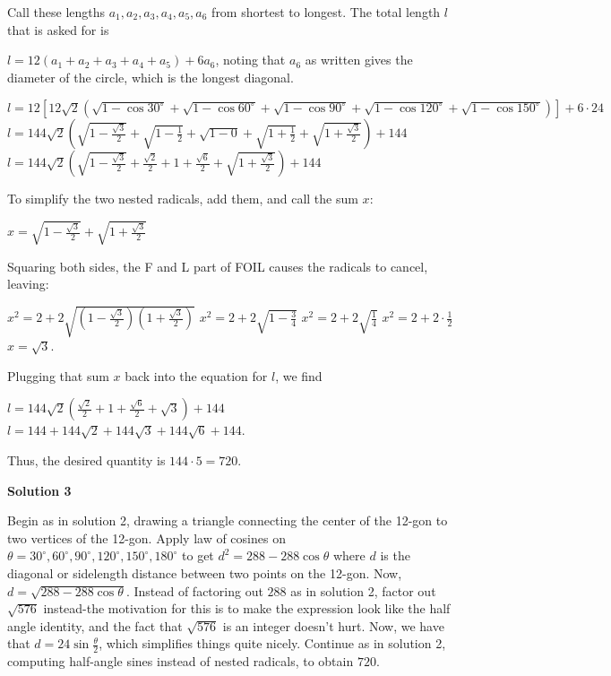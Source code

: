 \begin{enumerate}
 Call these lengths $a_1, a_2, a_3, a_4, a_5, a_6$ from shortest to longest.  The total length $l$ that is asked for is

 $l = 12(a_1 + a_2 + a_3 + a_4 + a_5) + 6a_6$, noting that $a_6$ as written gives the diameter of the circle, which is the longest diagonal.

 


 $l = 12[12\sqrt{2} (\sqrt{1 - \cos 30^{\circ}}+\sqrt{1-\cos 60^{\circ}}+\sqrt{1-\cos 90^{\circ}}+\sqrt{1-\cos 120^{\circ}}+\sqrt{1 - \cos 150^{\circ}})] + 6 \cdot 24$
$l = 144\sqrt{2} \left(\sqrt{1 - \frac{\sqrt{3}}{2}} + \sqrt{1 - \frac{1}{2}} + \sqrt{1-0} + \sqrt{1 + \frac{1}{2}} + \sqrt{1 + \frac{\sqrt{3}}{2}}\right) + 144$
$l = 144\sqrt{2} \left(\sqrt{1 - \frac{\sqrt{3}}{2}} + \frac{\sqrt{2}}{2} + 1 + \frac{\sqrt{6}}{2} + \sqrt{1 + \frac{\sqrt{3}}{2}}\right) + 144$

 
To simplify the two nested radicals, add them, and call the sum $x$:

 $x = \sqrt{1 - \frac{\sqrt{3}}{2}} + \sqrt{1 + \frac{\sqrt{3}}{2}}$

 Squaring both sides, the F and L part of FOIL causes the radicals to cancel, leaving:

 $x^2 = 2 + 2\sqrt{\left(1 - \frac{\sqrt{3}}{2}\right)\left(1 + \frac{\sqrt{3}}{2}\right)}$
$x^2 = 2 + 2\sqrt{1 - \frac{3}{4}}$
$x^2 = 2 + 2\sqrt{\frac{1}{4}}$
$x^2 = 2 + 2\cdot\frac{1}{2}$
$x = \sqrt{3}.$

 
Plugging that sum $x$ back into the equation for $l$, we find

 $l = 144\sqrt{2} \left(\frac{\sqrt{2}}{2} + 1 + \frac{\sqrt{6}}{2} + \sqrt{3}\right) + 144$
$l = 144 + 144\sqrt{2} + 144\sqrt{3} + 144\sqrt{6} + 144$.

 
Thus, the desired quantity is $144\cdot 5 = \boxed{720}$.

 



\textbf{Solution 3}

Begin as in solution 2, drawing a triangle connecting the center of the 12-gon to two vertices of the 12-gon. Apply law of cosines on $\theta = {30^{\circ}, 60^{\circ}, 90^{\circ}, 120^{\circ}, 150^{\circ}, 180^{\circ}}$ to get $d^2 = 288 - 288 \cos \theta$ where $d$ is the diagonal or sidelength distance between two points on the 12-gon. Now, $d=\sqrt{288-288 \cos \theta}$. Instead of factoring out $288$ as in solution 2, factor out $\sqrt{576}$ instead-the motivation for this is to make the expression look like the half angle identity, and the fact that $\sqrt{576}$ is an integer doesn't hurt. Now, we have that $d=24 \sin \frac{\theta}{2}$, which simplifies things quite nicely. Continue as in solution 2, computing half-angle sines instead of nested radicals, to obtain $\boxed{720}$.


\end{enumerate}
